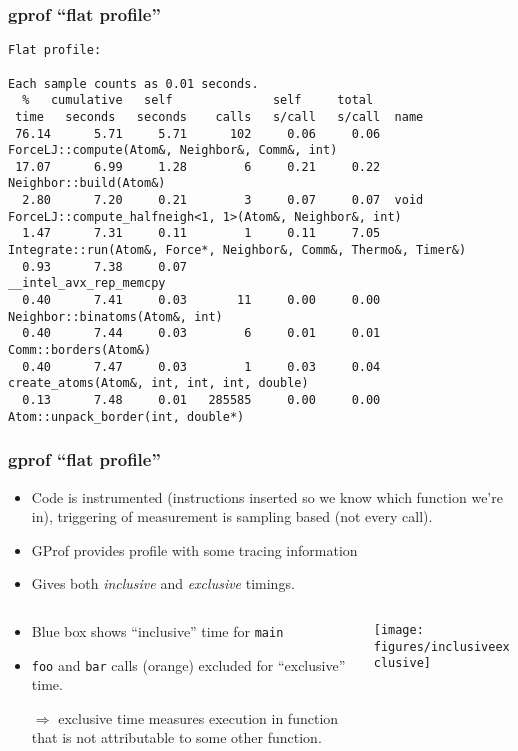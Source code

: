 \documentclass[dvipsnames,presentation,aspectratio=169,14pt]{beamer}
\begin{document}
\begin{frame}[fragile]
  \frametitle{gprof ``flat profile''}
\begin{verbatim}
Flat profile:

Each sample counts as 0.01 seconds.
  %   cumulative   self              self     total
 time   seconds   seconds    calls   s/call   s/call  name
 76.14      5.71     5.71      102     0.06     0.06  ForceLJ::compute(Atom&, Neighbor&, Comm&, int)
 17.07      6.99     1.28        6     0.21     0.22  Neighbor::build(Atom&)
  2.80      7.20     0.21        3     0.07     0.07  void ForceLJ::compute_halfneigh<1, 1>(Atom&, Neighbor&, int)
  1.47      7.31     0.11        1     0.11     7.05  Integrate::run(Atom&, Force*, Neighbor&, Comm&, Thermo&, Timer&)
  0.93      7.38     0.07                             __intel_avx_rep_memcpy
  0.40      7.41     0.03       11     0.00     0.00  Neighbor::binatoms(Atom&, int)
  0.40      7.44     0.03        6     0.01     0.01  Comm::borders(Atom&)
  0.40      7.47     0.03        1     0.03     0.04  create_atoms(Atom&, int, int, int, double)
  0.13      7.48     0.01   285585     0.00     0.00  Atom::unpack_border(int, double*)
\end{verbatim}
\end{frame}
\begin{frame}
  \frametitle{gprof ``flat profile''}
  \begin{itemize}
  \item Code is instrumented (instructions inserted so we know which
    function we're in), triggering of measurement is sampling based
    (not every call).
  \item GProf provides profile with some tracing information
  \item Gives both \emph{inclusive} and \emph{exclusive} timings.
  \end{itemize}
  \begin{columns}
    \begin{column}{0.45\textwidth}
      \begin{itemize}
      \item Blue box shows ``inclusive'' time for \texttt{main}
      \item \texttt{foo} and \texttt{bar} calls (orange) excluded for
        ``exclusive'' time.
      \item[$\Rightarrow$] exclusive time measures execution in
        function that is not attributable to some other function.
      \end{itemize}
    \end{column}
    \begin{column}{0.45\textwidth}
      \begin{center}
        \texttt{[image: figures/inclusiveexclusive]}
      \end{center}
    \end{column}
  \end{columns}
\end{frame}
\end{document}
